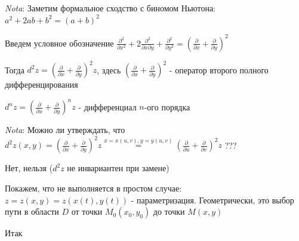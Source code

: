 \documentclass[12pt]{article}
\begin{document}
    \textit{Nota}: Заметим формальное сходство с биномом Ньютона: $\displaystyle a^2 + 2ab + b^2 = (a + b)^2$

    Введем условное обозначение $\displaystyle \frac{\partial^2}{\partial x^2} + 2 \frac{\partial^2}{\partial x \partial y} + \frac{\partial^2}{\partial y^2} = \left(\frac{\partial}{\partial x} + \frac{\partial}{\partial y}\right)^2$

    Тогда $\displaystyle d^2 z = \left(\frac{\partial}{\partial x} + \frac{\partial}{\partial y}\right)^2 z$, здесь $\displaystyle \left(\frac{\partial}{\partial x} + \frac{\partial}{\partial y}\right)^2$ - оператор второго полного дифференцирования

    $\displaystyle d^n z = \left(\frac{\partial}{\partial x} + \frac{\partial}{\partial y}\right)^n z$ - дифференциал $\displaystyle n$-ого порядка

    \hypertarget{noninvariantofseconddifferentialoffunctionoftwovariables}{}

    \textit{Nota}: Можно ли утверждать, что $\displaystyle d^2 z(x, y) = \left(\frac{\partial}{\partial x} + \frac{\partial}{\partial y}\right)^2 z \stackrel{x = x(u, v), y = y(u, v)}{=} \left(\frac{\partial}{\partial u} + \frac{\partial}{\partial v}\right)^2 z$ ???

    Нет, нельзя ($d^2 z$ не инвариантен при замене)

    Покажем, что не выполняется в простом случае: $\displaystyle z  = z(x, y) = z(x(t), y(t))$ - параметризация.
    Геометрически, это выбор пути в области $\displaystyle D$ от точки $\displaystyle M_0(x_0, y_0)$ до точки $\displaystyle M(x, y)$

    Итак
\end{document}
